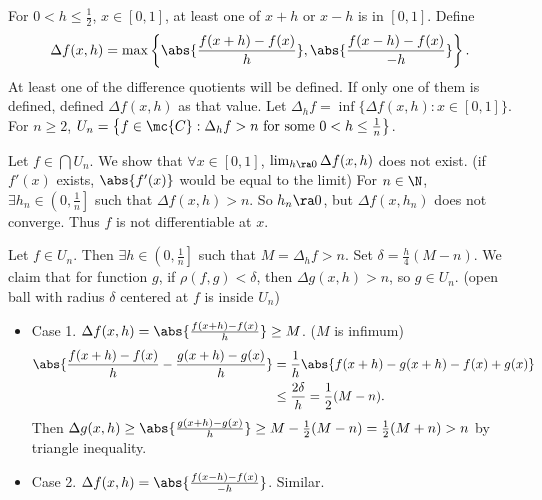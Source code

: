 For \(0 < h \leq \frac{1}{2}\), \(x \in [0, 1]\), at least one of \(x + h\) or \(x - h\) is in \([0, 1]\). Define
\[
    \Delta f(x, h) = \max\left\{\abs{\frac{f(x+h) - f(x)}{h}}, \abs{\frac{f(x-h) - f(x)}{-h}}\right\}.
\]
At least one of the difference quotients will be defined. If only one of them is defined, defined \(\Delta f(x, h)\) as that value. Let \(\Delta_h f = \inf \{\Delta f(x, h) : x\in [0, 1]\}\). For \(n \geq 2\), \(U_n = \left\{f \in \mc{C} : \Delta_hf > n \text{ for some } 0 < h \leq \frac{1}{n}\right\}\).

 Let \(f \in \bigcap U_n\). We show that \(\forall x \in [0, 1]\), \(\lim_{h \ra 0} \Delta f(x, h)\) does not exist. (if \(f'(x)\) exists, \(\abs{f'(x)}\) would be equal to the limit) For \(n \in \N\), \(\exists h_n \in \left(0, \frac{1}{n}\right]\) such that \(\Delta f(x, h) > n\). So \(h_n \ra 0\), but \(\Delta f(x, h_n)\) does not converge. Thus \(f\) is not differentiable at \(x\).

 Let \(f \in U_n\). Then \(\exists h \in \left(0, \frac{1}{n}\right]\) such that \(M = \Delta_h f > n\). Set \(\delta = \frac{h}{4}(M - n)\). We claim that for function \(g\), if \(\rho(f, g) < \delta\), then \(\Delta g(x, h) > n\), so \(g \in U_n\). (open ball with radius \(\delta\) centered at \(f\) is inside \(U_n\))
\begin{itemize}
    \item Case 1. \(\Delta f(x, h) = \abs{\frac{f(x + h) - f(x)}{h}} \geq M\). (\(M\) is infimum)
          \[
              \begin{aligned}
                  \abs{\frac{f(x+h) -f(x)}{h} - \frac{g(x+h)-g(x)}{h}} & = \frac{1}{h}\abs{f(x+h)-g(x+h) - f(x) + g(x)} \\ &\leq \frac{2\delta}{h} = \frac{1}{2}(M - n).
              \end{aligned}
          \]
          Then \(\Delta g(x, h) \geq \abs{\frac{g(x+h) - g(x)}{h}} \geq M - \frac{1}{2}(M - n) = \frac{1}{2}(M + n) > n\) by triangle inequality.
    \item Case 2. \(\Delta f(x, h) = \abs{\frac{f(x - h) - f(x)}{-h}}\). Similar.
\end{itemize}

